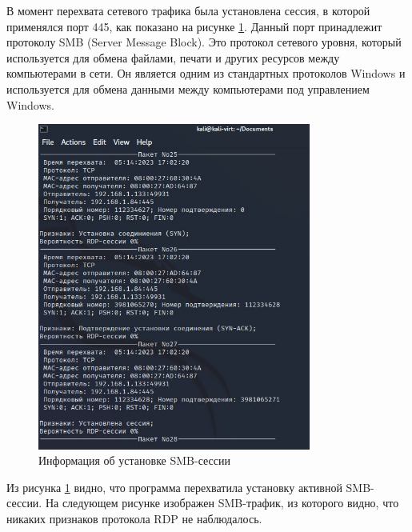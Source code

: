 \documentclass[bachelor, och, coursework]{SCWorks}
\begin{document}
В момент перехвата сетевого трафика была установлена сессия, в которой применялся порт 445, как показано на рисунке \ref{smb1}.
Данный порт принадлежит протоколу SMB (Server Message Block). Это протокол сетевого уровня, который используется для обмена 
файлами, печати и других ресурсов между компьютерами в сети. Он является одним из стандартных протоколов Windows и используется 
для обмена данными между компьютерами под управлением Windows.


\begin{figure}[H]
  \centering
  \includegraphics[width=0.8\textwidth]{photo/smb1.jpg}
  \caption{Информация об установке SMB-сессии}
  \label{smb1}
\end{figure}

Из рисунка \ref{smb1} видно, что программа перехватила установку активной SMB-сессии. На следующем рисунке изображен SMB-трафик,
из которого видно, что никаких признаков протокола RDP не наблюдалось.
\end{document}
